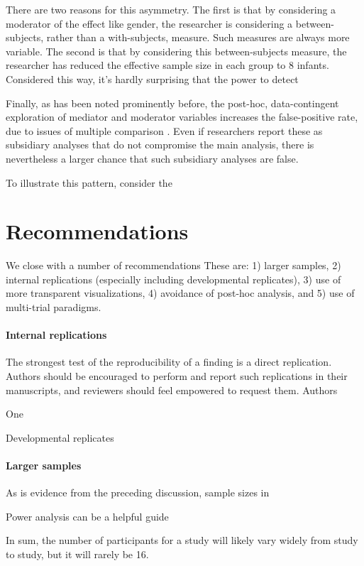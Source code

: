 \documentclass[man,noapacite]{apa2}
\begin{document}
There are two reasons for this asymmetry. The first is that by considering a moderator of the effect like gender, the researcher is considering a between-subjects, rather than a with-subjects, measure. Such measures are always more variable. The second is that by considering this between-subjects measure, the researcher has reduced the effective sample size in each group to 8 infants. Considered this way, it's hardly surprising that the power to detect 

Finally, as has been noted prominently before, the post-hoc, data-contingent exploration of mediator and moderator variables increases the false-positive rate, due to issues of multiple comparison  \cite{simonsohn2011}. Even if researchers report these as subsidiary analyses that do not compromise the main analysis, there is nevertheless a larger chance that such subsidiary analyses are false. 

To illustrate this pattern, consider the 

\section{Recommendations}

We close with a number of recommendations
These are: 1) larger samples, 2) internal replications (especially including developmental replicates), 3) use of more transparent visualizations, 4) avoidance of post-hoc analysis, and 5) use of multi-trial paradigms.

\paragraph{Internal replications}

The strongest test of the reproducibility of a finding is a direct replication. Authors should be encouraged to perform and report such replications in their manuscripts, and reviewers should feel empowered to request them. Authors

One 
 
Developmental replicates

\paragraph{Larger samples}

As is evidence from the preceding discussion, sample sizes in 

Power analysis can be a helpful guide

In sum, the number of participants for a study will likely vary widely from study to study, but it will rarely be 16. 
\end{document}
